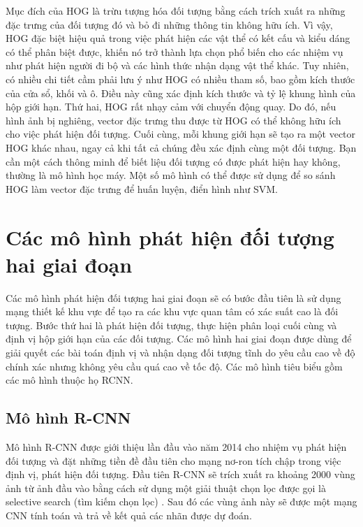\documentclass[../the.tex]{subfiles}
\begin{document}
\bigskip

{\fontsize{13}{12} \selectfont

	Mục đích của HOG là trừu tượng hóa đối tượng bằng cách trích xuất ra những đặc trưng của đối tượng đó và bỏ đi những thông tin không hữu ích.
	Vì vậy, HOG đặc biệt hiệu quả trong việc phát hiện các vật thể có kết cấu và kiểu dáng có thể phân biệt được, khiến nó trở thành lựa chọn phổ biến cho các nhiệm vụ như phát hiện người đi bộ và các hình thức nhận dạng vật thể khác.
	Tuy nhiên, có nhiều chi tiết cầm phải lưu ý như HOG có nhiều tham số, bao gồm kích thước của cửa sổ, khối và ô. Điều này cũng xác định kích thước và tỷ lệ khung hình của hộp giới hạn.
	Thứ hai, HOG rất nhạy cảm với chuyển động quay. Do đó, nếu hình ảnh bị nghiêng, vector đặc trưng thu được từ HOG có thể không hữu ích cho việc phát hiện đối tượng.
	Cuối cùng, mỗi khung giới hạn sẽ tạo ra một vector HOG khác nhau, ngay cả khi tất cả chúng đều xác định cùng một đối tượng. Bạn cần một cách thông minh để biết liệu đối tượng có được phát hiện hay không, thường là mô hình học máy.
	Một số mô hình có thể được sử dụng để so sánh HOG làm vector đặc trưng để huấn luyện, điển hình như SVM.

}

\section{Các mô hình phát hiện đối tượng hai giai đoạn }

 {\fontsize{13}{12} \selectfont

  Các mô hình phát hiện đối tượng hai giai đoạn sẽ có bước đầu tiên là sử dụng mạng thiết kế khu vực để tạo ra các khu vực quan tâm có xác suất cao là đối tượng.
  Bước thứ hai là phát hiện đối tượng, thực hiện phân loại cuối cùng và định vị hộp giới hạn của các đối tượng.
  Các mô hình hai giai đoạn được dùng để giải quyết các bài toán định vị và nhận dạng đối tượng tĩnh do yêu cầu cao về độ chính xác nhưng không yêu cầu quá cao về tốc độ.
  Các mô hình tiêu biểu gồm các mô hình thuộc họ RCNN.

 }

\subsection{Mô hình R-CNN}

{\fontsize{13}{12} \selectfont

	Mô hình R-CNN được giới thiệu lần đầu vào năm 2014 \cite{girshick2014rich} cho nhiệm vụ phát hiện đối tượng và đặt những tiền đề đầu tiên cho mạng nơ-ron tích chập
	trong việc định vị, phát hiện đối tượng. Đầu tiên R-CNN sẽ trích xuất ra khoảng 2000 vùng ảnh từ ảnh đầu vào bằng cách sử dụng một giải thuật chọn lọc được gọi là selective search (tìm kiếm chọn lọc) \cite{uijlings2013selective}.
	Sau đó các vùng ảnh này sẽ được một mạng CNN tính toán và trả về kết quả các nhãn được dự đoán.

}
\end{document}

